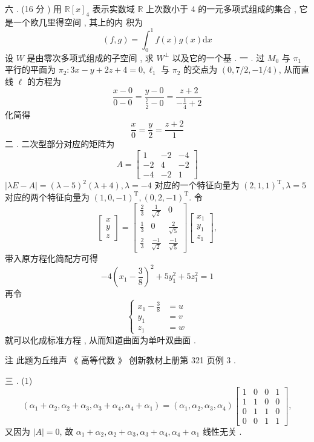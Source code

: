 \documentclass[10pt]{article}
\begin{document}
 六 . (16  分 )  用  $\mathbb{R}[x]_{4}$  表示实数域  $\mathbb{R}$  上次数小于  4  的一元多项式组成的集合 ,  它是一个欧几里得空间 ,  其上的内   积为 
$$
(f, g)=\int_{0}^{1} f(x) g(x) \mathrm{d} x
$$
 设  $W$  是由零次多项式组成的子空间 ,  求  $W^{\perp}$  以及它的一个基 .  一 .  过  $M_{0}$  与  $\pi_{1}$  平行的平面为  $\pi_{2}: 3 x-y+2 z+4=0, \ell_{1}$  与  $\pi_{2}$  的交点为  $(0,7 / 2,-1 / 4)$,  从而直线  $\ell$  的方程为 
$$
\frac{x-0}{0-0}=\frac{y-0}{\frac{7}{2}-0}=\frac{z+2}{-\frac{1}{4}+2}
$$
 化简得 
$$
\frac{x}{0}=\frac{y}{2}=\frac{z+2}{1}
$$
 二 .  二次型部分对应的矩阵为 
$$
A=\left[\begin{array}{ccc}
1 & -2 & -4 \\
-2 & 4 & -2 \\
-4 & -2 & 1
\end{array}\right]
$$
$|\lambda E-A|=(\lambda-5)^{2}(\lambda+4), \lambda=-4$  对应的一个特征向量为  $(2,1,1)^{\mathrm{T}}, \lambda=5$  对应的两个特征向量为  $(1,0,-1)^{\mathrm{T}},(0,2,-1)^{\mathrm{T}}$.  令 
$$
\left[\begin{array}{l}
x \\
y \\
z
\end{array}\right]=\left[\begin{array}{ccc}
\frac{2}{3} & \frac{1}{\sqrt{2}} & 0 \\
\frac{1}{3} & 0 & \frac{2}{\sqrt{5}} \\
\frac{2}{3} & \frac{-1}{\sqrt{2}} & \frac{-1}{\sqrt{5}}
\end{array}\right]\left[\begin{array}{l}
x_{1} \\
y_{1} \\
z_{1}
\end{array}\right],
$$
 带入原方程化简配方可得 
$$
-4\left(x_{1}-\frac{3}{8}\right)^{2}+5 y_{1}^{2}+5 z_{1}^{2}=1
$$
 再令 
$$
\left\{\begin{aligned}
x_{1}-\frac{3}{8} &=u \\
y_{1} &=v \\
z_{1} &=w
\end{aligned}\right.
$$
 就可以化成标准方程 ,  从而知道曲面为单叶双曲面 .

 注   此题为丘维声  《 高等代数 》 创新教材上册第  321  页例  3 .

 三 . (1)
$$
\left(\alpha_{1}+\alpha_{2}, \alpha_{2}+\alpha_{3}, \alpha_{3}+\alpha_{4}, \alpha_{4}+\alpha_{1}\right)=\left(\alpha_{1}, \alpha_{2}, \alpha_{3}, \alpha_{4}\right)\left[\begin{array}{llll}
1 & 0 & 0 & 1 \\
1 & 1 & 0 & 0 \\
0 & 1 & 1 & 0 \\
0 & 0 & 1 & 1
\end{array}\right],
$$
 又因为  $|A|=0$,  故  $\alpha_{1}+\alpha_{2}, \alpha_{2}+\alpha_{3}, \alpha_{3}+\alpha_{4}, \alpha_{4}+\alpha_{1}$  线性无关 .
\end{document}
